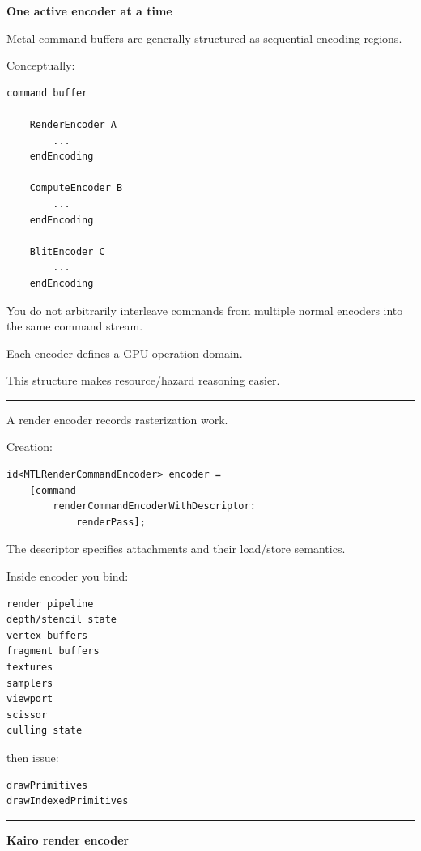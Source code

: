 \textbf{One active encoder at a time}

Metal command buffers are generally structured as sequential encoding regions.

Conceptually:

\begin{verbatim}
command buffer

    RenderEncoder A
        ...
    endEncoding

    ComputeEncoder B
        ...
    endEncoding

    BlitEncoder C
        ...
    endEncoding
\end{verbatim}

You do not arbitrarily interleave commands from multiple normal encoders into the same command stream.

Each encoder defines a GPU operation domain.

This structure makes resource/hazard reasoning easier.

\begin{center}\rule{0.5\linewidth}{0.5pt}\end{center}

\textbf{}

A render encoder records rasterization work.

Creation:

\begin{verbatim}
id<MTLRenderCommandEncoder> encoder =
    [command
        renderCommandEncoderWithDescriptor:
            renderPass];
\end{verbatim}

The descriptor specifies attachments and their load/store semantics.

Inside encoder you bind:

\begin{verbatim}
render pipeline
depth/stencil state
vertex buffers
fragment buffers
textures
samplers
viewport
scissor
culling state
\end{verbatim}

then issue:

\begin{verbatim}
drawPrimitives
drawIndexedPrimitives
\end{verbatim}

\begin{center}\rule{0.5\linewidth}{0.5pt}\end{center}

\textbf{Kairo render encoder}


